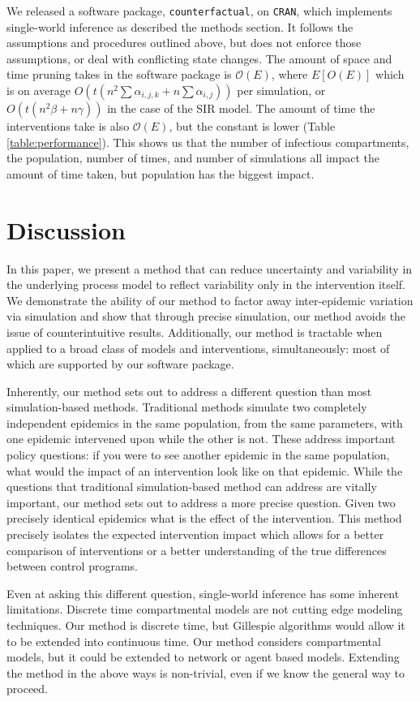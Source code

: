 \documentclass[PTRSB]{rsos}
\begin{document}
\begin{multicols}{2}
We released a software package, \texttt{counterfactual}, on \texttt{CRAN}, %
which implements single-world inference as described the methods section.
It follows the assumptions and procedures outlined above, but does not enforce those assumptions, or deal with conflicting state changes.
The amount of space and time pruning takes in the software package is $\mathcal O(E)$, where $E[O(E)]$ which is on average $O(t(n^2\sum \alpha_{i,j,k} + n \sum\alpha_{i,j}))$ per simulation, or $O(t(n^2\beta + n\gamma))$ in the case of the SIR model.
The amount of time the interventions take is also $\mathcal O(E)$, but the constant is lower (Table \ref{table:performance}).
This shows us that the number of infectious compartments, the population, number of times, and number of simulations all impact the amount of time taken, but population has the biggest impact.

\section{Discussion}
In this paper, we present a method that can reduce uncertainty and variability in the underlying process model to reflect variability only in the intervention itself.
We demonstrate the ability of our method to factor away inter-epidemic variation via simulation and show that through precise simulation, our method avoids the issue of counterintuitive results. 
Additionally, our method is tractable when applied to a broad class of models and interventions, simultaneously: most of which are supported by our software package.

Inherently, our method sets out to address a different question than most simulation-based methods. 
Traditional methods simulate two completely independent epidemics in the same population, from the same parameters, with one epidemic intervened upon while the other is not. 
These address important policy questions: if you were to see another epidemic in the same population, what would the impact of an intervention look like on that epidemic. 
While the questions that traditional simulation-based method can address are vitally important, our method sets out to address a more precise question. 
Given two precisely identical epidemics what is the effect of the intervention. 
This method precisely isolates the expected intervention impact which allows for a better comparison of interventions or a better understanding of the true differences between control programs.

Even at asking this different question, single-world inference has some inherent limitations.
Discrete time compartmental models are not cutting edge modeling techniques.
Our method is discrete time, but Gillespie algorithms would allow it to be extended into continuous time.
Our method considers compartmental models, but it could be extended to network or agent based models.
Extending the method in the above ways is non-trivial, even if we know the general way to proceed.


\end{multicols}
\end{document}
